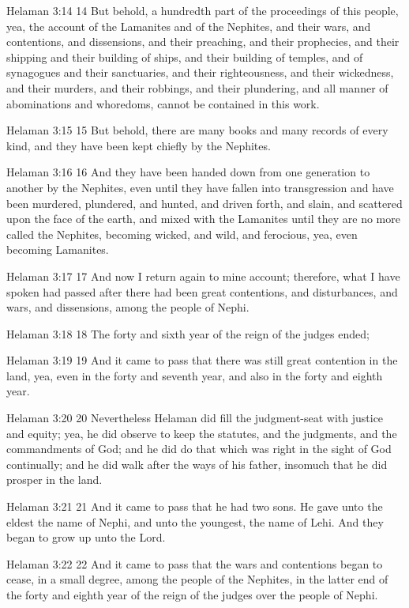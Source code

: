 Helaman 3:14
 14 But behold, a hundredth part of the proceedings of this
people, yea, the account of the Lamanites and of the Nephites,
and their wars, and contentions, and dissensions, and their
preaching, and their prophecies, and their shipping and their
building of ships, and their building of temples, and of
synagogues and their sanctuaries, and their righteousness, and
their wickedness, and their murders, and their robbings, and
their plundering, and all manner of abominations and whoredoms,
cannot be contained in this work.

Helaman 3:15
 15 But behold, there are many books and many records of every
kind, and they have been kept chiefly by the Nephites.

Helaman 3:16
 16 And they have been handed down from one generation to another
by the Nephites, even until they have fallen into transgression
and have been murdered, plundered, and hunted, and driven forth,
and slain, and scattered upon the face of the earth, and mixed
with the Lamanites until they are no more called the Nephites,
becoming wicked, and wild, and ferocious, yea, even becoming
Lamanites.

Helaman 3:17
 17 And now I return again to mine account; therefore, what I
have spoken had passed after there had been great contentions,
and disturbances, and wars, and dissensions, among the people of
Nephi.

Helaman 3:18
 18 The forty and sixth year of the reign of the judges ended;

Helaman 3:19
 19 And it came to pass that there was still great contention in
the land, yea, even in the forty and seventh year, and also in
the forty and eighth year.

Helaman 3:20
 20 Nevertheless Helaman did fill the judgment-seat with justice
and equity; yea, he did observe to keep the statutes, and the
judgments, and the commandments of God; and he did do that which
was right in the sight of God continually; and he did walk after
the ways of his father, insomuch that he did prosper in the land.

Helaman 3:21
 21 And it came to pass that he had two sons. He gave unto the
eldest the name of Nephi, and unto the youngest, the name of
Lehi. And they began to grow up unto the Lord.

Helaman 3:22
 22 And it came to pass that the wars and contentions began to
cease, in a small degree, among the people of the Nephites, in
the latter end of the forty and eighth year of the reign of the
judges over the people of Nephi.

